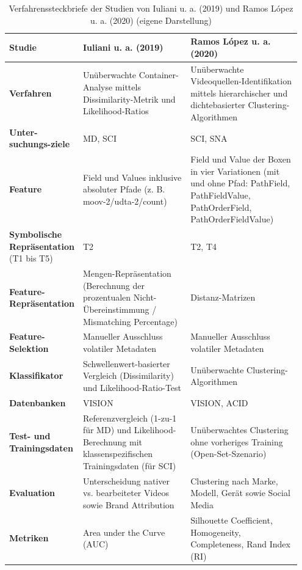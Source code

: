 \begin{table}[H]
    \centering
    \begin{tabular}{>{\raggedright\arraybackslash}p{0.15\linewidth}>{\raggedright\arraybackslash}p{0.4\linewidth}>{\raggedright\arraybackslash}p{0.4\linewidth}}\toprule
 \textbf{Studie}& Iuliani u. a. (2019) \cite{iuliani_video_2019}&	
Ramos López u. a. (2020) \cite{ramos_lopez_digital_2020}\\\midrule
         \textbf{Verfahren}&  Unüberwachte Container-Analyse mittels Dissimilarity-Metrik und Likelihood-Ratios&Unüberwachte Videoquellen-Identifikation mittels hierarchischer und dichtebasierter Clustering-Algorithmen\\\midrule
         \textbf{Unter-suchungs-ziele}&  MD, SCI&SCI, SNA\\\midrule
         \textbf{Feature}&  Field und Values inklusive absoluter Pfade (z. B. moov-2/udta-2/count)&Field und Value der Boxen in vier Variationen (mit und ohne Pfad: PathField, PathFieldValue, PathOrderField, PathOrderFieldValue)\\\midrule
         \textbf{Symbolische Repräsentation} (T1 bis T5)&  T2&T2, T4\\\midrule
         \textbf{Feature-Repräsentation}&  Mengen-Repräsentation (Berechnung der prozentualen Nicht-Übereinstimmung / Mismatching Percentage)&Distanz-Matrizen\\\midrule
         \textbf{Feature-Selektion}&  	
Manueller Ausschluss volatiler Metadaten&Manueller Ausschluss volatiler Metadaten\\\midrule
         \textbf{Klassifikator}&  Schwellenwert-basierter Vergleich (Dissimilarity) und Likelihood-Ratio-Test&Unüberwachte Clustering-Algorithmen \\\midrule
         \textbf{Datenbanken}&  VISION&VISION, ACID\\\midrule
         \textbf{Test- und Trainingsdaten}&  Referenzvergleich (1-zu-1 für MD) und Likelihood-Berechnung mit klassenspezifischen Trainingsdaten (für SCI)&Unüberwachtes Clustering ohne vorheriges Training (Open-Set-Szenario)\\\midrule
         \textbf{Evaluation}& Unterscheidung nativer vs. bearbeiteter Videos sowie Brand Attribution&Clustering nach Marke, Modell, Gerät sowie Social Media \\\midrule
         \textbf{Metriken}& Area under the Curve (AUC)&Silhouette Coefficient, Homogeneity, Completeness, Rand Index (RI)\\ \bottomrule
    \end{tabular}
    \caption{Verfahrenssteckbriefe der Studien von Iuliani u. a. (2019) \cite{iuliani_video_2019} und Ramos López u. a. (2020) \cite{ramos_lopez_digital_2020} (eigene Darstellung)}
    \label{tab:steckbrief-qual}
\end{table}

